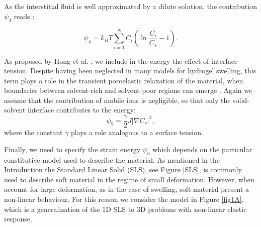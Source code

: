 \documentclass[runningheads]{llncs}
\begin{document}
As the interstitial fluid is well approximated by a dilute solution, the contribution $\psi_4$ reads \cite{Reviewpolyel,ecm1,ecm2}:

\begin{equation}
\psi_4 = k_B T \sum\limits_{i=1}^{N} C_i \left(\ln \frac{C_i}{ C_s}-1\right).
\end{equation}

As proposed by Hong et al. \cite{Interface}, we include in the energy the effect of interface tension. Despite having been neglected in many models for hydrogel swelling, this term plays a role in the transient poroelastic relaxation of the material, when boundaries between solvent-rich and solvent-poor regions can emerge \cite{sarah,Interface}. Again we assume that the contribution of mobile ions is negligible, so that only the solid-solvent interface contributes to the energy:
\begin{equation}
\psi_5 = \frac{\gamma}{2} J \left|\nabla C_s\right|^2,
\end{equation}
where the constant $\gamma$ plays a role analogous to a surface tension.

Finally, we need to specify the strain energy $\psi_6$ which depends on the particular constitutive model used to describe the material. As mentioned in the Introduction the Standard Linear Solid (SLS), see Figure \ref{SLS}, is commonly used to describe soft material in the regime of small deformation. However, when account for large deformation, as in the case of swelling, soft material present a non-linear behaviour. For this reason we consider the model in Figure \ref{fig1A}, which is a generalization of the 1D SLS to 3D problems with non-linear elastic response. 
\end{document}
